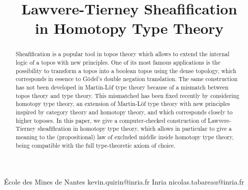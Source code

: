 \documentclass[preprint,9pt,numbers]{sigplanconf}
\begin{document}
\setlength{\pdfpageheight}{\paperheight}
\setlength{\pdfpagewidth}{\paperwidth}




\title{Lawvere-Tierney Sheafification\\ in Homotopy Type Theory}

           {\'Ecole des Mines de Nantes}
           {kevin.quirin@inria.fr}
           {Inria}
           {nicolas.tabareau@inria.fr}

\maketitle

\begin{abstract}
  Sheafification is a popular tool in topos theory which
  allows to extend the internal logic of a topos with new
  principles. One of its most famous applications is the possibility
  to transform a topos into a boolean topos using the
  dense topology, which corresponds in essence to Gödel's double
  negation translation.
  The same construction has not been developed in Martin-Löf type
  theory because of a mismatch between topos theory and type theory. This
  mismatched has been fixed recently by considering homotopy type
  theory, an extension of Martin-Löf type theory with new
  principles inspired by category theory and homotopy theory, and
  which corresponds closely to higher toposes.
  In this paper, we give a computer-checked construction of
  Lawvere-Tierney sheafification in homotopy type theory, which allows
  in particular to give a meaning to the (propositional) law of
  excluded middle inside homotopy type theory, being
  compatible with the full type-theoretic axiom of choice.
\end{abstract}

\end{document}
